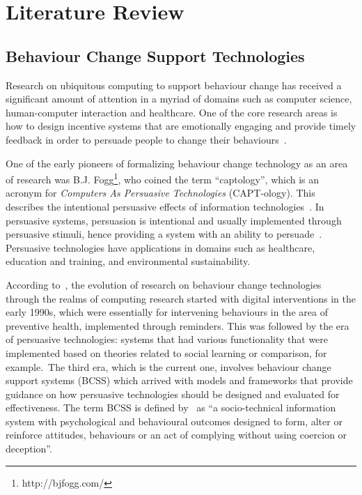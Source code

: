 
\chapter{Literature Review} %

\label{literaturereview} %


\section{Behaviour Change Support Technologies}
Research on ubiquitous computing to support behaviour change  has received a significant amount of attention in a myriad of domains such as computer science, human-computer interaction and healthcare. One of the core research areas is how to design incentive systems that are emotionally engaging and  provide timely feedback in order to persuade people to change their behaviours~\citep{nakajima2013designing}. 

One of the early pioneers of formalizing behaviour change technology as an area of research was B.J. Fogg\footnote{http://bjfogg.com/}, who coined the term ``captology'', which is an acronym for \emph{Computers As Persuasive Technologies} (CAPT-ology). This describes the intentional persuasive effects of information technologies~\citep{fogg1999persuasive}. In persuasive systems, persuasion is intentional and usually implemented through persuasive stimuli, hence providing a system with an ability to persuade~\citep{hamari2014persuasive}. Persuasive technologies have applications in domains such as healthcare, education and training, and environmental sustainability.

According to~\cite{langrial2012digital}, the evolution of research on behaviour change technologies through the realms of computing research started with digital interventions in the early 1990s, which were essentially for intervening behaviours in the area of preventive health, implemented through reminders. This was followed by the era of persuasive technologies: systems that had various functionality that were implemented based on theories related to social learning or comparison, for example.~The third era, which is the current one, involves behaviour change support systems (BCSS) which arrived with models and frameworks that provide guidance on how persuasive technologies should be designed and evaluated for effectiveness. The term BCSS is defined by~\cite{Oinas-Kukkonen:foundation} as ``a socio-technical information system with psychological and behavioural outcomes designed to form, alter or reinforce attitudes, behaviours or an act of complying without using coercion or deception''.

